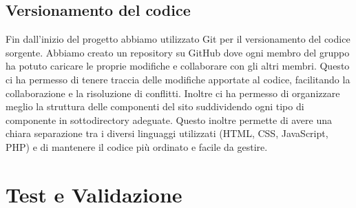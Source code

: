 \documentclass[11pt,a4paper]{article}
\begin{document}
\subsection{Versionamento del codice}
Fin dall'inizio del progetto abbiamo utilizzato Git per il versionamento del codice sorgente. Abbiamo creato un repository su GitHub dove ogni membro del gruppo ha potuto caricare le proprie modifiche e collaborare con gli altri membri.
Questo ci ha permesso di tenere traccia delle modifiche apportate al codice, facilitando la collaborazione e la risoluzione di conflitti.
Inoltre ci ha permesso di organizzare meglio la struttura delle componenti del sito suddividendo ogni tipo di componente in sottodirectory adeguate. Questo inoltre permette di avere una chiara separazione tra i diversi linguaggi utilizzati (HTML, CSS, JavaScript, PHP) e di mantenere il codice più ordinato e facile da gestire.

\section{Test e Validazione}
\end{document}
